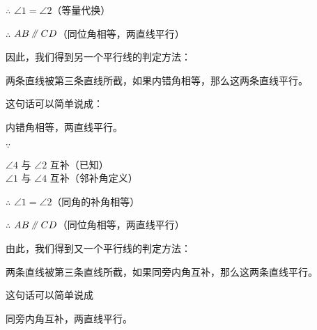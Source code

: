 $\therefore$ \quad $\angle 1 = \angle 2$（等量代换）

$\therefore$ \quad $AB \pingxing CD$（同位角相等，两直线平行）

因此，我们得到另一个平行线的判定方法：

\begin{gongli}
    两条直线被第三条直线所截，如果内错角相等，那么这两条直线平行。
\end{gongli}

这句话可以简单说成：\begin{gongli}
    内错角相等，两直线平行。
\end{gongli}

$\because$ \quad \begin{zmtblr}[t]{}
    $\angle 4$ 与 $\angle 2$ 互补（已知）\\
    $\angle 1$ 与 $\angle 4$ 互补（邻补角定义）
\end{zmtblr}

$\therefore$ \quad $\angle 1 = \angle 2$（同角的补角相等）

$\therefore$ \quad $AB \pingxing CD$（同位角相等，两直线平行）

由此，我们得到又一个平行线的判定方法：

\begin{gongli}
    两条直线被第三条直线所截，如果同旁内角互补，那么这两条直线平行。
\end{gongli}

这句话可以简单说成\begin{gongli}%
    同旁内角互补，两直线平行。
\end{gongli}


